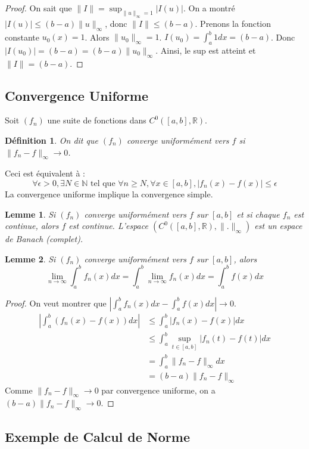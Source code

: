 \documentclass{article}
\newtheorem{lemma}{Lemme} %
\newtheorem{definition}{Définition} %
\theoremstyle{definition} %
\begin{document}
\begin{proof}
On sait que $\|I\| = \sup_{\|u\|_\infty = 1} |I(u)|$.
On a montré $|I(u)| \le (b-a) \|u\|_\infty$, donc $\|I\| \le (b-a)$.
Prenons la fonction constante $u_0(x) = 1$. Alors $\|u_0\|_\infty = 1$.
$I(u_0) = \int_a^b 1 dx = (b-a)$.
Donc $|I(u_0)| = (b-a) = (b-a) \|u_0\|_\infty$.
Ainsi, le sup est atteint et $\|I\| = (b-a)$.
\end{proof}

\subsection{Convergence Uniforme}
Soit $(f_n)$ une suite de fonctions dans $C^0([a,b], \mathbb{R})$.
\begin{definition}
On dit que $(f_n)$ converge uniformément vers $f$ si $\|f_n - f\|_\infty \to 0$.
\end{definition}

Ceci est équivalent à :
\[ \forall \epsilon > 0, \exists N \in \mathbb{N} \text{ tel que } \forall n \ge N, \forall x \in [a,b], |f_n(x) - f(x)| \le \epsilon \]
La convergence uniforme implique la convergence simple.

\begin{lemma}
Si $(f_n)$ converge uniformément vers $f$ sur $[a,b]$ et si chaque $f_n$ est continue, alors $f$ est continue.
L'espace $(C^0([a,b], \mathbb{R}), \|.\|_\infty)$ est un espace de Banach (complet).
\end{lemma}

\begin{lemma}
Si $(f_n)$ converge uniformément vers $f$ sur $[a,b]$, alors
\[ \lim_{n \to \infty} \int_a^b f_n(x) dx = \int_a^b \lim_{n \to \infty} f_n(x) dx = \int_a^b f(x) dx \]
\end{lemma}
\begin{proof}
On veut montrer que $\left| \int_a^b f_n(x) dx - \int_a^b f(x) dx \right| \to 0$.
\begin{align*} \left| \int_a^b (f_n(x) - f(x)) dx \right| &\le \int_a^b |f_n(x) - f(x)| dx \\ &\le \int_a^b \sup_{t \in [a,b]} |f_n(t) - f(t)| dx \\ &= \int_a^b \|f_n - f\|_\infty dx \\ &= (b-a) \|f_n - f\|_\infty \end{align*}
Comme $\|f_n - f\|_\infty \to 0$ par convergence uniforme, on a $(b-a) \|f_n - f\|_\infty \to 0$.
\end{proof}

\subsection{Exemple de Calcul de Norme}
\end{document}
